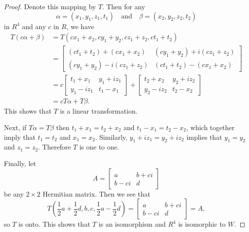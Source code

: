 \begin{proof}
  Denote this mapping by $T$. Then for any
  \begin{equation*}
    \alpha = (x_1,y_1,z_1,t_1) \quad\text{and}\quad
    \beta = (x_2,y_2,z_2,t_2)
  \end{equation*}
  in $R^4$ and any $c$ in $R$, we have
  \begin{align*}
    T(c\alpha + \beta)
    &= T(cx_1 + x_2, cy_1 + y_2, cz_1 + z_2, ct_1 + t_2) \\
    &=
    \begin{bmatrix}
      (ct_1 + t_2) + (cx_1 + x_2) & (cy_1 + y_2) + i(cz_1 + z_2) \\
      (cy_1 + y_2) - i(cz_1 + z_2) & (ct_1 + t_2) - (cx_1 + x_2)
    \end{bmatrix} \\
    &= c
    \begin{bmatrix}
      t_1 + x_1 & y_1 + iz_1 \\
      y_1 - iz_1 & t_1 - x_1
    \end{bmatrix}
    +
    \begin{bmatrix}
      t_2 + x_2 & y_2 + iz_2 \\
      y_2 - iz_2 & t_2 - x_2
    \end{bmatrix} \\
    &= cT\alpha + T\beta.
  \end{align*}
  This shows that $T$ is a linear transformation.

  Next, if $T\alpha = T\beta$ then $t_1 + x_1 = t_2 + x_2$ and
  $t_1 - x_1 = t_2 - x_2$, which together imply that $t_1 = t_2$ and
  $x_1 = x_2$. Similarly, $y_1 + iz_1 = y_2 + iz_2$ implies that
  $y_1 = y_2$ and $z_1 = z_2$. Therefore $T$ is one to one.

  Finally, let
  \begin{equation*}
    A =
    \begin{bmatrix}
      a & b + ci \\
      b - ci & d
    \end{bmatrix}
  \end{equation*}
  be any $2\times2$ Hermitian matrix. Then we see that
  \begin{equation*}
    T\left(\frac12a + \frac12d, b, c, \frac12a - \frac12d\right)
    =
    \begin{bmatrix}
      a & b + ci \\
      b - ci & d
    \end{bmatrix}
    = A,
  \end{equation*}
  so $T$ is onto. This shows that $T$ is an isomorphism and $R^4$ is
  isomorphic to $W$.
\end{proof}
